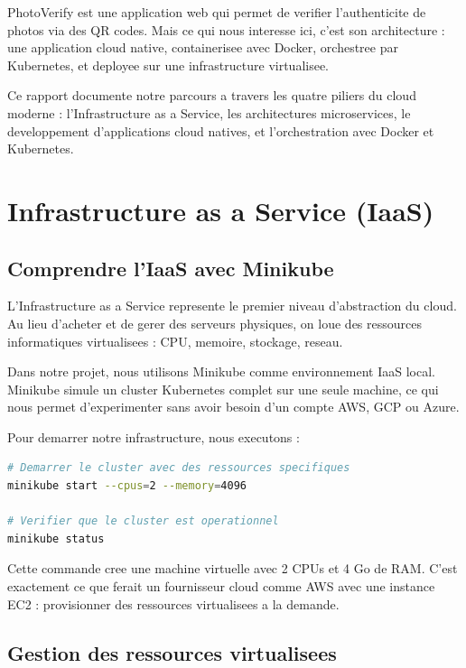 \documentclass[12pt,a4paper]{article}
\begin{document}
PhotoVerify est une application web qui permet de verifier l'authenticite de photos via des QR codes. Mais ce qui nous interesse ici, c'est son architecture : une application cloud native, containerisee avec Docker, orchestree par Kubernetes, et deployee sur une infrastructure virtualisee.

Ce rapport documente notre parcours a travers les quatre piliers du cloud moderne : l'Infrastructure as a Service, les architectures microservices, le developpement d'applications cloud natives, et l'orchestration avec Docker et Kubernetes.

\section{Infrastructure as a Service (IaaS)}

\subsection{Comprendre l'IaaS avec Minikube}

L'Infrastructure as a Service represente le premier niveau d'abstraction du cloud. Au lieu d'acheter et de gerer des serveurs physiques, on loue des ressources informatiques virtualisees : CPU, memoire, stockage, reseau.

Dans notre projet, nous utilisons Minikube comme environnement IaaS local. Minikube simule un cluster Kubernetes complet sur une seule machine, ce qui nous permet d'experimenter sans avoir besoin d'un compte AWS, GCP ou Azure.

Pour demarrer notre infrastructure, nous executons :

\begin{lstlisting}[language=bash, caption={Demarrage de l'infrastructure Minikube}]
# Demarrer le cluster avec des ressources specifiques
minikube start --cpus=2 --memory=4096

# Verifier que le cluster est operationnel
minikube status
\end{lstlisting}

Cette commande cree une machine virtuelle avec 2 CPUs et 4 Go de RAM. C'est exactement ce que ferait un fournisseur cloud comme AWS avec une instance EC2 : provisionner des ressources virtualisees a la demande.

\subsection{Gestion des ressources virtualisees}
\end{document}
